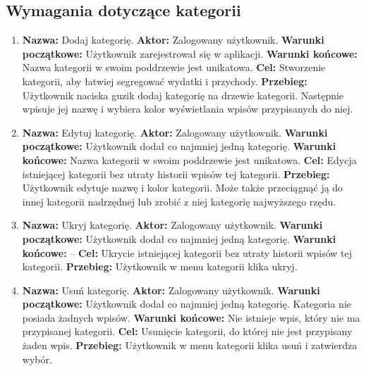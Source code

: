 \subsection{Wymagania dotyczące kategorii}
\label{subsec:wymagania-kategorie}

\begin{enumerate}[labelwidth=1em,label=\arabic*.]
\item \textbf{Nazwa:} Dodaj kategorię. \newline
    \textbf{Aktor:} Zalogowany użytkownik. \newline
    \textbf{Warunki początkowe:} Użytkownik zarejestrował się w aplikacji. \newline
    \textbf{Warunki końcowe:} Nazwa kategorii w swoim poddrzewie jest unikatowa. \newline
    \textbf{Cel:} Stworzenie kategorii, aby łatwiej segregować wydatki i przychody. \newline
    \textbf{Przebieg:} Użytkownik naciska guzik dodaj kategorię na drzewie kategorii. Następnie wpisuje jej nazwę i wybiera kolor wyświetlania wpisów przypisanych do niej.
\item \textbf{Nazwa:} Edytuj kategorię. \newline
    \textbf{Aktor:} Zalogowany użytkownik. \newline
    \textbf{Warunki początkowe:} Użytkownik dodał co najmniej jedną kategorię. \newline
    \textbf{Warunki końcowe:} Nazwa kategorii w swoim poddrzewie jest unikatowa. \newline
    \textbf{Cel:} Edycja istniejącej kategorii bez utraty historii wpisów tej kategorii. \newline
    \textbf{Przebieg:} Użytkownik edytuje nazwę i kolor kategorii. Może także przeciągnąć ją do innej kategorii nadrzędnej lub zrobić z niej kategorię najwyższego rzędu.
\item \textbf{Nazwa:} Ukryj kategorię. \newline
    \textbf{Aktor:} Zalogowany użytkownik. \newline
    \textbf{Warunki początkowe:} Użytkownik dodał co najmniej jedną kategorię. \newline
    \textbf{Warunki końcowe:} -- \newline
    \textbf{Cel:} Ukrycie istniejącej kategorii bez utraty historii wpisów tej kategorii. \newline
    \textbf{Przebieg:} Użytkownik w menu kategorii klika ukryj.
\item \textbf{Nazwa:} Usuń kategorię. \newline
    \textbf{Aktor:} Zalogowany użytkownik. \newline
    \textbf{Warunki początkowe:} Użytkownik dodał co najmniej jedną kategorię. Kategoria nie posiada żadnych wpisów. \newline
    \textbf{Warunki końcowe:} Nie istnieje wpis, który nie ma przypisanej kategorii. \newline
    \textbf{Cel:} Usunięcie kategorii, do której nie jest przypisany żaden wpis. \newline
    \textbf{Przebieg:} Użytkownik w menu kategorii klika usuń i zatwierdza wybór.
\end{enumerate}

